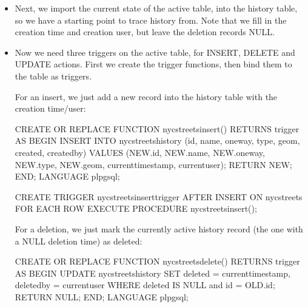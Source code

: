 \documentclass[a4paper,11pt,english]{sphinxmanual}
\begin{document}
\begin{itemize}
\item {} 
Next, we import the current state of the active table,  into the history table, so we have a starting point to trace history from. Note that we fill in the creation time and creation user, but leave the deletion records NULL.

\begin{sphinxVerbatim}[commandchars=\\\{\}]
  
        
          
    
\end{sphinxVerbatim}

\item {} 
Now we need three triggers on the active table, for INSERT, DELETE and UPDATE actions. First we create the trigger functions, then bind them to the table as triggers.

For an insert, we just add a new record into the history table with the creation time/user:

\begin{sphinxVerbatim}[commandchars=\\\{\}]
CREATE OR REPLACE FUNCTION nyc\PYGZus{}streets\PYGZus{}insert() RETURNS trigger AS
\PYGZdl{}\PYGZdl{}
  BEGIN
    INSERT INTO nyc\PYGZus{}streets\PYGZus{}history
      (id, name, oneway, type, geom, created, created\PYGZus{}by)
    VALUES
      (NEW.id, NEW.name, NEW.oneway, NEW.type, NEW.geom,
       current\PYGZus{}timestamp, current\PYGZus{}user);
    RETURN NEW;
  END;
\PYGZdl{}\PYGZdl{}
LANGUAGE plpgsql;

CREATE TRIGGER nyc\PYGZus{}streets\PYGZus{}insert\PYGZus{}trigger
AFTER INSERT ON nyc\PYGZus{}streets
  FOR EACH ROW EXECUTE PROCEDURE nyc\PYGZus{}streets\PYGZus{}insert();
\end{sphinxVerbatim}

For a deletion, we just mark the currently active history record (the one with a NULL deletion time) as deleted:

\begin{sphinxVerbatim}[commandchars=\\\{\}]
CREATE OR REPLACE FUNCTION nyc\PYGZus{}streets\PYGZus{}delete() RETURNS trigger AS
\PYGZdl{}\PYGZdl{}
  BEGIN
    UPDATE nyc\PYGZus{}streets\PYGZus{}history
      SET deleted = current\PYGZus{}timestamp, deleted\PYGZus{}by = current\PYGZus{}user
      WHERE deleted IS NULL and id = OLD.id;
    RETURN NULL;
  END;
\PYGZdl{}\PYGZdl{}
LANGUAGE plpgsql;


\end{sphinxVerbatim}
\end{itemize}
\end{document}
